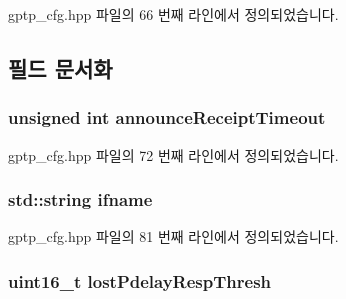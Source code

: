 gptp\+\_\+cfg.\+hpp 파일의 66 번째 라인에서 정의되었습니다.



\subsection{필드 문서화}
\subsubsection[{\texorpdfstring{announce\+Receipt\+Timeout}{announceReceiptTimeout}}]{\setlength{\rightskip}{0pt plus 5cm}unsigned int announce\+Receipt\+Timeout}\hypertarget{struct_gptp_ini_parser_1_1gptp__cfg__t_a05905c66231ef6fc18d4208c42ce0702}{}\label{struct_gptp_ini_parser_1_1gptp__cfg__t_a05905c66231ef6fc18d4208c42ce0702}


gptp\+\_\+cfg.\+hpp 파일의 72 번째 라인에서 정의되었습니다.

\subsubsection[{\texorpdfstring{ifname}{ifname}}]{\setlength{\rightskip}{0pt plus 5cm}std\+::string ifname}\hypertarget{struct_gptp_ini_parser_1_1gptp__cfg__t_a487996221bd46263f88d58f72a6d4db6}{}\label{struct_gptp_ini_parser_1_1gptp__cfg__t_a487996221bd46263f88d58f72a6d4db6}


gptp\+\_\+cfg.\+hpp 파일의 81 번째 라인에서 정의되었습니다.

\subsubsection[{\texorpdfstring{lost\+Pdelay\+Resp\+Thresh}{lostPdelayRespThresh}}]{\setlength{\rightskip}{0pt plus 5cm}uint16\+\_\+t lost\+Pdelay\+Resp\+Thresh}\hypertarget{struct_gptp_ini_parser_1_1gptp__cfg__t_ab04b7c6ced77ef2b302011ce412ca781}{}\label{struct_gptp_ini_parser_1_1gptp__cfg__t_ab04b7c6ced77ef2b302011ce412ca781}


